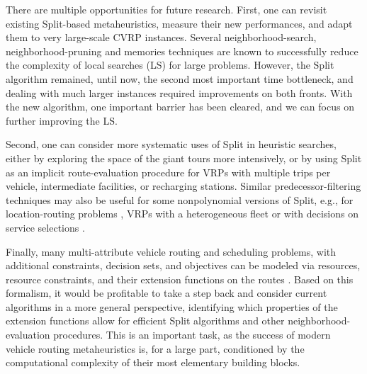 \documentclass[11pt]{article}
\newcommand{\blue}[1]{{#1}}
\begin{document}
\blue{There are multiple opportunities for future research.
First, one can revisit existing Split-based metaheuristics, measure their new performances, and adapt them to very large-scale CVRP instances.
Several neighborhood-search, neighborhood-pruning and memories techniques \citep{Bentley1992,Toth2003,Irnich2006,Vidal2012b} are known to successfully reduce the complexity of local searches (LS) for large problems. However, the Split algorithm remained, until now, the second most important time bottleneck, and dealing with much larger instances required improvements on both fronts. With the new  algorithm, one important barrier has been cleared, and we can focus on further improving the LS.





Second, one can consider more systematic uses of Split in heuristic searches, either by exploring the space of the giant tours \citep{Prins2004,Prins2009c} more intensively, or by using Split as an implicit route-evaluation procedure \citep{Vidal2015,Vidal2014} for VRPs with multiple trips per vehicle, intermediate facilities, or recharging stations.
Similar predecessor-filtering techniques may also be useful for some nonpolynomial versions of Split, e.g., for location-routing problems \citep{Duhamel2010}, VRPs with a heterogeneous fleet \citep{Duhamel2011a} or with decisions on service selections \citep{Vidal2014}.}

Finally, many multi-attribute vehicle routing and scheduling problems, with additional constraints, decision sets, and objectives can be modeled via resources, resource constraints, and their extension functions on the routes \citep{Desaulniers1998a,Irnich2008b}. Based on this formalism, it would be profitable to take a step back and consider current algorithms in a more general perspective, identifying which properties of the extension functions allow for efficient Split algorithms and other neighborhood-evaluation procedures. This is an important task, as the success of modern vehicle routing metaheuristics is, for a large part, conditioned by the computational complexity of their most elementary building blocks.
\end{document}
